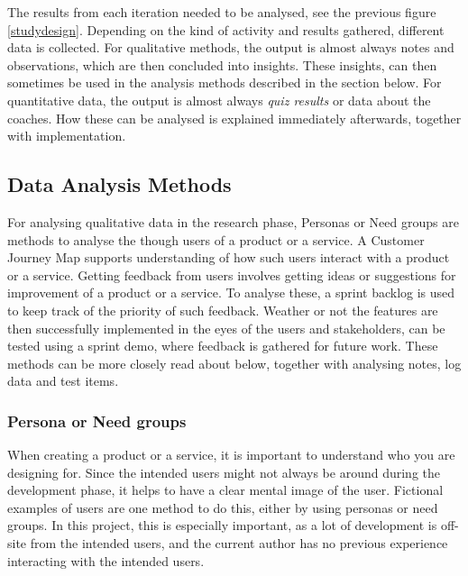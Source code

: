 The results from each iteration needed to be analysed, see the previous figure \ref{studydesign}. Depending on the kind of activity and results gathered, different data is collected. For qualitative methods, the output is almost always notes and observations, which are then concluded into insights. These insights, can then sometimes be used in the analysis methods described in the section below. For quantitative data, the output is almost always \textit{quiz results} or data about the coaches. How these can be analysed is explained immediately afterwards, together with implementation. %

\subsection{Data Analysis Methods}\label{sec:data-analysis}


For analysing qualitative data in the research phase, Personas or Need groups are methods to analyse the though users of a product or a service. A Customer Journey Map supports understanding of how such users interact with a product or a service. Getting feedback from users involves getting ideas or suggestions for improvement of a product or a service. To analyse these, a sprint backlog is used to keep track of the priority of such feedback. Weather or not the features are then successfully implemented in the eyes of the users and stakeholders, can be tested using a sprint demo, where feedback is gathered for future work. These methods can be more closely read about below, together with analysing notes, log data and test items.

\subsubsection{Persona or Need groups}
When creating a product or a service, it is important to understand who you are designing for. Since the intended users might not always be around during the development phase, it helps to have a clear mental image of the user. Fictional examples of users are one method to do this, either by using personas or need groups.  In this project, this is especially important, as a lot of development is off-site from the intended users, and the current author has no previous experience interacting with the intended users.

